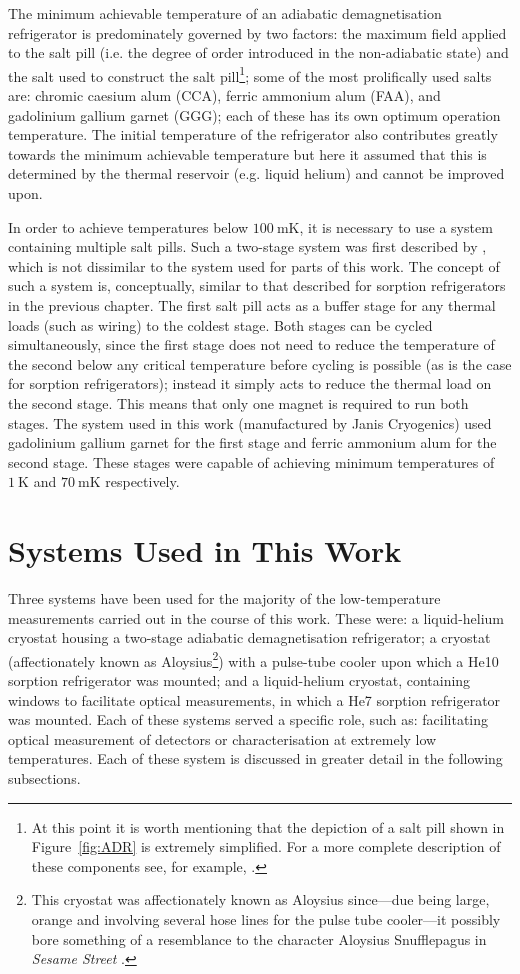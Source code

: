 \par
The minimum achievable temperature of an adiabatic demagnetisation refrigerator is predominately governed by two factors: the maximum field applied to the salt pill (i.e. the degree of order introduced in the non-adiabatic state) and the salt used to construct the salt pill\footnote{At this point it is worth mentioning that the depiction of a salt pill shown in Figure~\ref{fig:ADR} is extremely simplified. For a more complete description of these components see, for example, \textcite{Hagmann1994}.}; some of the  most prolifically used salts are: chromic caesium alum (CCA), ferric ammonium alum (FAA), and gadolinium gallium garnet (GGG); each of these has its own optimum operation temperature. The initial temperature of the refrigerator also contributes greatly towards the minimum achievable temperature but here it assumed that this is determined by the thermal reservoir (e.g. liquid helium) and cannot be improved upon.
\par 
In order to achieve temperatures below $100~\mathrm{mK}$, it is necessary to use a system containing multiple salt pills. Such a two-stage system was first described by \textcite{Hagmann1994b}, which is not dissimilar to the system used for parts of this work. The concept of such a system is, conceptually, similar to that described for sorption refrigerators in the previous chapter. The first salt pill acts as a buffer stage for any thermal loads (such as wiring) to the coldest stage. Both stages can be cycled simultaneously, since the first stage does not need to reduce the temperature of the second below any critical temperature before cycling is possible (as is the case for sorption refrigerators); instead it simply acts to reduce the thermal load on the second stage. This means that only one magnet is required to run both stages. The system used in this work (manufactured by Janis Cryogenics) used gadolinium gallium garnet for the first stage and ferric ammonium alum for the second stage. These stages were capable of achieving minimum temperatures of $1~\mathrm{K}$ and $70~\mathrm{mK}$ respectively.
%
\section{Systems Used in This Work}\label{sec:cryostats}
Three systems have been used for the majority of the low-temperature measurements carried out in the course of this work. These were: a liquid-helium cryostat housing a two-stage adiabatic demagnetisation refrigerator; a cryostat (affectionately known as Aloysius\footnote{This cryostat was affectionately known as Aloysius since---due being large, orange and involving several hose lines for the pulse tube cooler---it possibly bore something of a resemblance to the character Aloysius Snufflepagus in \textit{Sesame Street} \parencite[see][]{SesameWWW}.}) with a pulse-tube cooler upon which a He10 sorption refrigerator was mounted; and a liquid-helium cryostat, containing  windows to facilitate optical measurements, in which a He7 sorption refrigerator was mounted. Each of these systems served a specific role, such as: facilitating optical measurement of detectors or characterisation at extremely low temperatures. Each of these system is discussed in greater detail in the following subsections.
%
